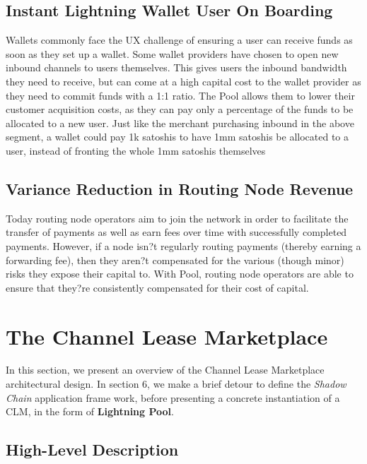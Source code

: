\documentclass[12pt,a4paper]{article}
\theoremstyle{definition}
\begin{document}
\subsection{Instant Lightning Wallet User On Boarding}

Wallets commonly face the UX challenge of ensuring a user can receive funds as
soon as they set up a wallet. Some wallet providers have chosen to open new
inbound channels to users themselves. This gives users the inbound bandwidth
they need to receive, but can come at a high capital cost to the wallet
provider as they need to commit funds with a 1:1 ratio. The Pool allows them to
lower their customer acquisition costs, as they can pay only a percentage of
the funds to be allocated to a new user. Just like the merchant purchasing
inbound in the above segment, a wallet could pay 1k satoshis to have 1mm
satoshis be allocated to a user, instead of fronting the whole 1mm satoshis
themselves

\subsection{Variance Reduction in Routing Node Revenue}

Today routing node operators aim to join the network in order to facilitate the
transfer of payments as well as earn fees over time with successfully completed
payments. However, if a node isn?t regularly routing payments (thereby earning
a forwarding fee), then they aren?t compensated for the various (though minor)
risks they expose their capital to. With Pool, routing node operators are able
to ensure that they?re consistently compensated for their cost of capital. 

\section{The Channel Lease Marketplace} %

In this section, we present an overview of the Channel Lease Marketplace
architectural design. In section 6, we make a brief detour to define the
\emph{Shadow Chain} application frame work, before presenting a concrete
instantiation of a CLM, in the form of \textbf{Lightning Pool}. 

\subsection{High-Level Description}
\end{document}

